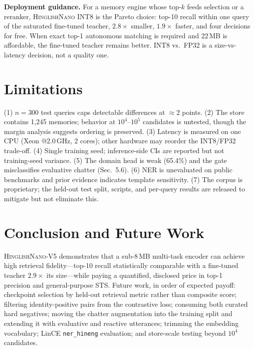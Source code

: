 \documentclass[11pt]{article}
\newcommand{\nano}{\textsc{HinglishNano}}
\begin{document}
\textbf{Deployment guidance.} For a memory engine whose top-$k$ feeds selection or a reranker, \nano{} INT8 is the Pareto choice: top-10 recall within one query of the saturated fine-tuned teacher, $2.8\times$ smaller, $1.9\times$ faster, and four decisions for free. When exact top-1 autonomous matching is required and 22\,MB is affordable, the fine-tuned teacher remains better. INT8 vs.\ FP32 is a size-vs-latency decision, not a quality one.

\section{Limitations}
(1) $n{=}300$ test queries caps detectable differences at $\approx$2 points. (2) The store contains 1{,}245 memories; behavior at $10^4$--$10^5$ candidates is untested, though the margin analysis suggests ordering is preserved. (3) Latency is measured on one CPU (Xeon @2.0\,GHz, 2 cores); other hardware may reorder the INT8/FP32 trade-off. (4) Single training seed; inference-side CIs are reported but not training-seed variance. %
(5) The domain head is weak (65.4\%) and the gate misclassifies evaluative chatter (Sec.~5.6). (6) NER is unevaluated on public benchmarks and prior evidence indicates template sensitivity. %
(7) The corpus is proprietary; the held-out test split, scripts, and per-query results are released to mitigate but not eliminate this.

\section{Conclusion and Future Work}
\nano{}-V5 demonstrates that a sub-8\,MB multi-task encoder can achieve high retrieval fidelity---top-10 recall statistically comparable with a fine-tuned teacher $2.9\times$ its size---while paying a quantified, disclosed price in top-1 precision and general-purpose STS. Future work, in order of expected payoff: checkpoint selection by held-out retrieval metric rather than composite score; filtering identity-positive pairs from the contrastive loss; consuming both curated hard negatives; moving the chatter augmentation into the training split and extending it with evaluative and reactive utterances; trimming the embedding vocabulary; LinCE \texttt{ner\_hineng} evaluation; and store-scale testing beyond $10^4$ candidates.
\end{document}
